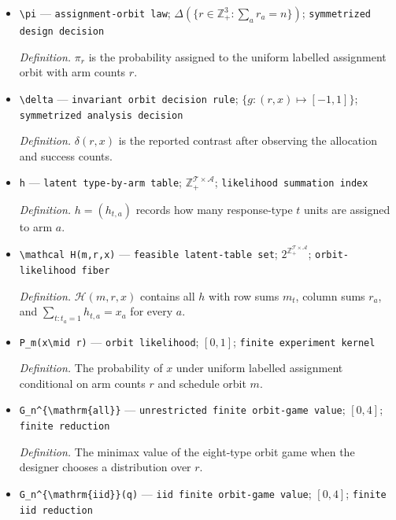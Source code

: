 \documentclass{article}
\begin{document}
\begin{itemize}
  \item \texttt{\textbackslash{}\allowbreak{}pi} --- \texttt{assignment-\allowbreak{}orbit law}; \(\Delta(\{r\in\mathbb Z_+^3:\sum_ar_a=n\})\); \texttt{symmetrized design decision}
  \par\smallskip\noindent\emph{Definition.} \(\pi_r\) is the probability assigned to the uniform labelled assignment orbit with arm counts \(r\).
  \item \texttt{\textbackslash{}\allowbreak{}delta} --- \texttt{invariant orbit decision rule}; \(\{g:(r,x)\mapsto[-1,1]\}\); \texttt{symmetrized analysis decision}
  \par\smallskip\noindent\emph{Definition.} \(\delta(r,x)\) is the reported contrast after observing the allocation and success counts.
  \item \texttt{h} --- \texttt{latent type-\allowbreak{}by-\allowbreak{}arm table}; \(\mathbb Z_+^{\mathcal T\times\mathcal A}\); \texttt{likelihood summation index}
  \par\smallskip\noindent\emph{Definition.} \(h=(h_{t,a})\) records how many response-type \(t\) units are assigned to arm \(a\).
  \item \texttt{\textbackslash{}\allowbreak{}mathcal H(m,\allowbreak{}r,\allowbreak{}x)} --- \texttt{feasible latent-\allowbreak{}table set}; \(2^{\mathbb Z_+^{\mathcal T\times\mathcal A}}\); \texttt{orbit-\allowbreak{}likelihood fiber}
  \par\smallskip\noindent\emph{Definition.} \(\mathcal H(m,r,x)\) contains all \(h\) with row sums \(m_t\), column sums \(r_a\), and \(\sum_{t:t_a=1}h_{t,a}=x_a\) for every \(a\).
  \item \texttt{P\_\allowbreak{}m(x\textbackslash{}\allowbreak{}mid r)} --- \texttt{orbit likelihood}; \([0,1]\); \texttt{finite experiment kernel}
  \par\smallskip\noindent\emph{Definition.} The probability of \(x\) under uniform labelled assignment conditional on arm counts \(r\) and schedule orbit \(m\).
  \item \texttt{G\_\allowbreak{}n\textasciicircum{}\{\textbackslash{}\allowbreak{}mathrm\{all\}\allowbreak{}\}\allowbreak{}} --- \texttt{unrestricted finite orbit-\allowbreak{}game value}; \([0,4]\); \texttt{finite reduction}
  \par\smallskip\noindent\emph{Definition.} The minimax value of the eight-type orbit game when the designer chooses a distribution over \(r\).
  \item \texttt{G\_\allowbreak{}n\textasciicircum{}\{\textbackslash{}\allowbreak{}mathrm\{iid\}\allowbreak{}\}\allowbreak{}(q)} --- \texttt{iid finite orbit-\allowbreak{}game value}; \([0,4]\); \texttt{finite iid reduction}

\end{itemize}
\end{document}
